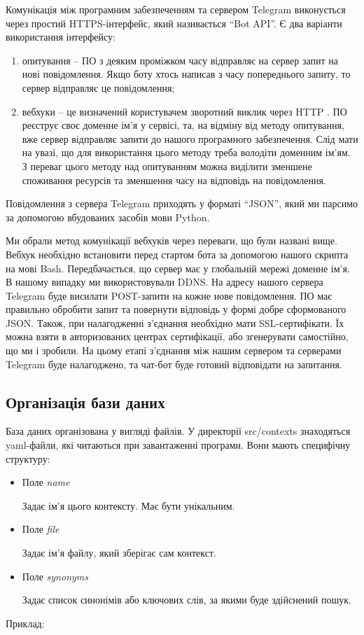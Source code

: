 \documentclass[a4paper,14pt]{extreport}
\begin{document}
    Комунікація між програмним забезпеченням та сервером Telegram виконується через простий HTTPS-інтерфейс, який називається ``Bot API''. Є два варіанти використання інтерфейсу:
    \begin{enumerate}
        \item опитування -- ПО з деяким проміжком часу відправляє на сервер запит на нові повідомлення. Якщо боту хтось написав з часу попереднього запиту, то сервер відправляє це повідомлення;
        \item вебхуки -- це визначений користувачем зворотний виклик через HTTP \cite{webhooks:define}. ПО реєструє своє доменне ім'я у сервісі, та, на відміну від методу опитування, вже сервер відправляє запити до нашого програмного забезпечення. Слід мати на увазі, що для використання цього методу треба володіти доменним ім'ям. З переваг цього методу над опитуванням можна виділити зменшене споживання ресурсів \cite{webhooks:good} та зменшення часу на відповідь на повідомлення.
    \end{enumerate}
    
    Повідомлення з сервера Telegram приходять у форматі ``JSON'', який ми парсимо за допомогою вбудованих засобів мови Python.

    Ми обрали метод комунікації вебхуків через переваги, що були названі вище. Вебхук необхідно встановити перед стартом бота за допомогою нашого скрипта на мові Bash. Передбачається, що сервер має у глобальній мережі доменне ім'я. В нашому випадку ми використовували DDNS. На адресу нашого сервера Telegram буде висилати POST-запити на кожне нове повідомлення. ПО має правильно обробити запит та повернути відповідь у формі добре сформованого JSON. Також, при налагодженні з'єднання необхідно мати SSL-сертифікати. Їх можна взяти в авторизованих центрах сертифікації, або згенерувати самостійно, що ми і зробили. На цьому етапі з'єднання між нашим сервером та серверами Telegram буде налагоджено, та чат-бот буде готовий відповідати на запитання.

    \subsection{Організація бази даних}
    База даних організована у вигляді файлів. У директорії src/contexts знаходяться yaml-файли, які читаються при завантаженні програми. Вони мають специфічну структуру:
    \begin{itemize}
        \item Поле \it{name}

            Задає ім'я цього контексту. Має бути унікальним.

        \item Поле \it{file}

            Задає ім'я файлу, який зберігає сам контекст.

        \item Поле \it{synonyms}

            Задає список синонімів або ключових слів, за якими буде здійснений пошук.
    \end{itemize}
    Приклад:
    \inputminted[breaklines,linenos=true]{yaml}{./sample.yaml}
\end{document}
